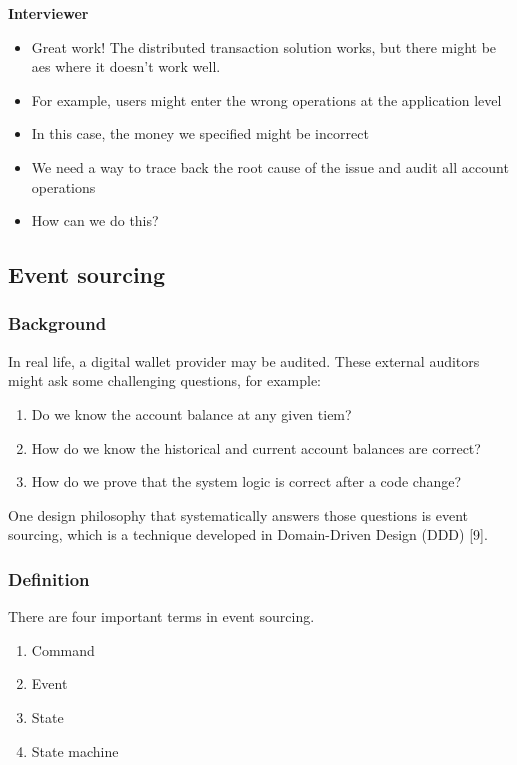 \documentclass{report}
\theoremstyle{definition}
\let\oldsubsection\subsection
\let\oldsubsubsection\subsubsection
\renewcommand{\subsection}{\oldsubsection*}
\renewcommand{\subsubsection}{\oldsubsubsection*}
\begin{document}
\textbf{Interviewer}

\begin{itemize}
\item
Great work! The distributed transaction solution works, but there might be aes where it doesn't work well.
\item
For example, users might enter the wrong operations at the application level
\item
In this case, the money we specified might be incorrect
\item
We need a way to trace back the root cause of the issue and audit all account operations
\item
How can we do this?
\end{itemize}

\subsection{Event sourcing}

\subsubsection{Background}

In real life, a digital wallet provider may be audited. These external auditors might ask some challenging questions, for example:

\begin{enumerate}
\item
Do we know the account balance at any given tiem?
\item
How do we know the historical and current account balances are correct?
\item
How do we prove that the system logic is correct after a code change?
\end{enumerate}

One design philosophy that systematically answers those questions is event sourcing, which is a technique developed in Domain-Driven Design (DDD) [9].

\subsubsection{Definition}

There are four important terms in event sourcing.

\begin{enumerate}
\item
Command
\item
Event
\item
State
\item
State machine
\end{enumerate}
\end{document}
